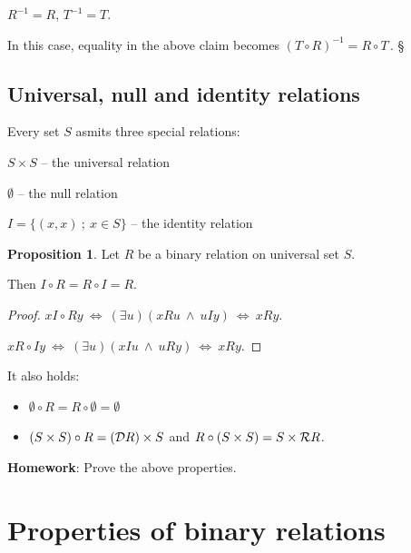 \documentclass[11pt,paper=b5,footinclude,headinclude]{scrbook} %
\def\inn {{~\wedge~}}
\def\cee {{~\Leftrightarrow~}}
\def\kz{{\hfill{\S}}}%
\theoremstyle{remark}
\theoremstyle{definition} %
\theoremstyle{theorem} %
\newtheorem*{proposition}{Proposition}
\begin{document}
$R^{-1}= R$, $T^{-1} = T$.

In this case, equality in the above claim becomes
$(T\circ R)^{-1} = R \circ T\,.$
\kz



\subsection{Universal, null and identity relations}

Every set $S$ asmits three special relations:

$S\times S$ -- the universal relation

$\emptyset$ -- the null relation

$I = \{(x,x)~;~x\in S\}$ -- the identity relation

\begin{proposition}
Let $R$ be a binary relation on universal set $S$.

Then $I\circ R = R\circ I = R$.
\end{proposition}

\begin{proof}
$xI\circ Ry \cee (\exists u)(xRu \inn uIy) \cee xRy$.

$xR\circ Iy \cee (\exists u)(xIu \inn uRy) \cee xRy$.
\end{proof}

\medskip
It also holds:

\begin{itemize}
  \item $\emptyset \circ R = R\circ \emptyset = \emptyset$
  \item $(S\times S)\circ R =
({\cal D}R) \times S$ and $R\circ (S\times S) = S\times {\cal R}R$.
\end{itemize}

%

\bigskip

\textbf{ Homework}: Prove the above properties.


\section{Properties of binary relations}
\end{document}
